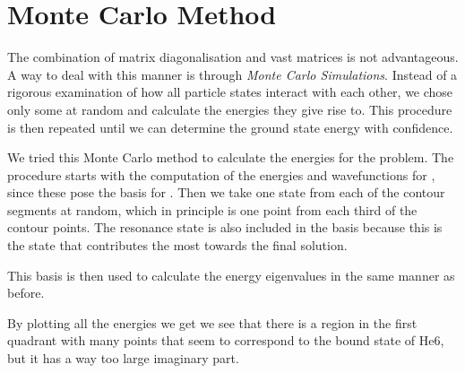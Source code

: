 \documentclass[../main/report.tex]{subfiles}
\begin{document}
\chapter{Monte Carlo Method}
\label{cha:monte_carlo}

The combination of matrix diagonalisation and vast matrices is not advantageous.
A way to deal with this manner is through \emph{Monte Carlo Simulations}.
Instead of a rigorous examination of how all particle states interact with each other, we chose only some at random and calculate the energies they give rise to.
This procedure is then repeated until we can determine the ground state energy with confidence.

We tried this Monte Carlo method to calculate the energies for the  problem.
The procedure starts with the computation of the energies and wavefunctions for , since these pose the basis for .
Then we take one state from each of the contour segments at random, which in principle is one point from each third of the contour points.
The resonance state is also included in the basis because this is the state that contributes the most towards the final solution.

This basis is then used to calculate the energy eigenvalues in the same manner as before.

By plotting all the energies we get we see that there is a region in the first quadrant with many points that seem to correspond to the  bound state of He{6}, but it has a way too large imaginary part.

\end{document}
